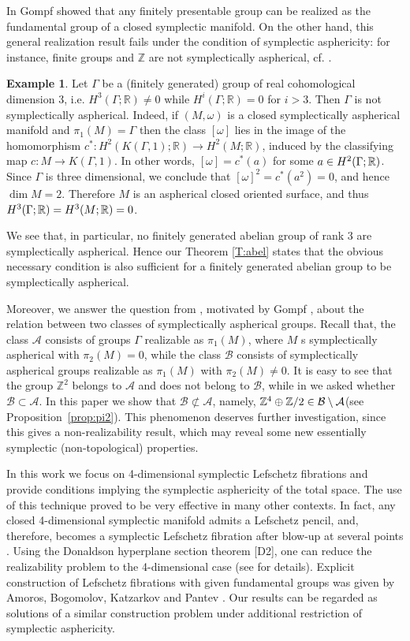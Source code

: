 \documentclass[12pt]{amsart}
\newcommand{\B}[1]{{\mathbb #1}}
\newcommand{\Z}{\B Z}
\newcommand{\R}{\B R}
\theoremstyle{definition}
\newtheorem{example}[subsection]{Example}
\theoremstyle{remark}
\numberwithin{figure}{section}
\numberwithin{table}{section}
\numberwithin{equation}{section}
\def\m{\medskip}
\newcommand{\om}{{\omega}}
\newcommand{\Ga}{{\Gamma}}
\newcommand{\Mo}{(M,\omega )}
\newcommand\propref{Proposition~\ref}
\newcommand\AAA{\mathcal A}
\newcommand\BBB{\mathcal B}
\begin{document}
\m In \cite{G2} Gompf showed that any finitely presentable group can
be realized as the fundamental group of a closed symplectic manifold.
On the other hand, this general realization result fails under the condition of 
symplectic asphericity: for instance, finite groups and $\Z$ are not  
symplectically aspherical, cf. \cite{IKRT}. 

\begin{example}\label{E:3dim} 
Let $\Ga$ be a (finitely generated) group of real cohomological
dimension 3, i.e. $H^3(\Ga;\R)\ne 0$  while $H^i(\Ga;\R)=0$ for $i>3$. 
Then $\Ga$ is not  symplectically aspherical. 
Indeed, if $\Mo$ is a closed symplectically aspherical manifold and 
$\pi_1(M)=\Ga$ then the class $[\om]$ lies 
in the image of the homomorphism $c^*:H^2(K(\Ga,1);\R)\to H^2(M;\R)$, 
induced by the classifying map $c: M \to K(\Ga,1)$. In other words, $[\omega]=c^*(a)$ for some 
$a\in H\sp 2(\Ga;\R)$.
Since $\Ga$ is three dimensional, we conclude that $[\om]^2=c^*(a^2) =0$, and hence
$\dim M = 2$. Therefore $M$ is an aspherical closed oriented  
surface, and thus $H^3(\Ga;\R)=H\sp 3(M;\R)=0$. 
\end{example} 

\m We see that, in particular, no finitely generated abelian group of rank 3 are  
symplectically aspherical. Hence our Theorem \ref{T:abel} states that the obvious necessary 
condition is also sufficient for a finitely generated abelian
group to be symplectically aspherical.

\m
Moreover, we answer the question from \cite{IKRT}, motivated by
Gompf \cite{G2}, about the relation between two classes of symplectically 
aspherical groups. 
Recall that, the class $\AAA$ consists of groups $\Gamma$ realizable as
$\pi_1(M)$, where $M$  s symplectically aspherical with $\pi_2(M)=0$, while 
the class $\BBB$ consists of symplectically aspherical groups realizable
as $\pi_1(M)$ with  $\pi_2(M)\not=0$. 
It is easy to see that the group $\Z^2$ belongs to $\AAA$ and does not
belong to $\BBB$,  while in \cite{IKRT} we asked whether $\BBB
\subset \AAA$.  
In this paper we show that $\BBB\not\subset\AAA$, namely, $\Z\sp 4 \oplus \Z/2\in \BBB \setminus \AAA$(see \propref{prop:pi2}). This  phenomenon deserves further investigation,
since this gives a  non-realizability result, which may reveal some
new essentially symplectic (non-topological) properties.

\m
In this work we focus on 4-dimensional symplectic Lefschetz fibrations
and provide conditions implying the symplectic asphericity of the
total space. The use of this technique proved to be very effective in
many other contexts. In fact, any
closed 4-dimensional  symplectic manifold admits a Lefschetz pencil, and, 
therefore, becomes a symplectic Lefschetz fibration after blow-up at
several points \cite{D1, GS}. 
Using the Donaldson hyperplane section theorem [D2], one can reduce
the realizability  problem to the 4-dimensional case 
(see \cite[Proposition 2.2]{IKRT}
for details). Explicit construction of Lefschetz 
fibrations with given fundamental groups was given by
Amoros, Bogomolov, Katzarkov and Pantev \cite{ABKP}. 
Our results can be regarded as solutions of a similar construction 
problem under additional restriction of symplectic asphericity.    
\end{document}
